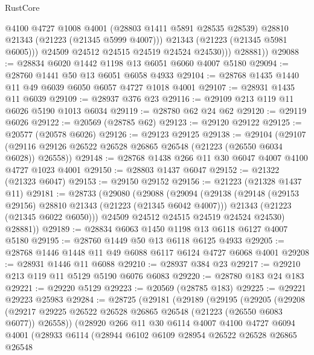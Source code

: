 \begin{lexlean}{RustCore}
\begin{coremodule}
                  @4100
                  @4727
                  @1008
                  @4001
                  (@28803 @1411 @5891 @28535 @28539)
                  @28810
                  @21343
                  (@21223 (@21345 @5999 @4007)))
                @21343
                (@21223 (@21345 @5981 @6005)))
              @24509
              @24512
              @24515
              @24519
              @24524
              @24530)))
        @28881))
@29088 := @28834 @6020 @1442 @1198 @13 @6051 @6060 @4007 @5180
@29094 := @28760 @1441 @50 @13 @6051 @6058 @4933
@29104 := @28768 @1435 @1440 @11 @49 @6039 @6050 @6057 @4727 @1018 @4001
@29107 := @28931 @1435 @11 @6039
@29109 := @28937 @376 @23
@29116 := @29109 @213 @119 @11 @6026 @5190 @1013 @6034
@29119 := @28780 @62 @24 @62
@29120 := @29119 @6026
@29122 := @20569 (@28785 @62)
@29123 := @29120 @29122
@29125 := @20577 (@20578 @6026)
@29126 := @29123 @29125
@29138 := @29104
    (@29107 (@29116 @29126 @26522 @26528 @26865 @26548 (@21223 (@26550 @6034 @6028)) @26558))
@29148 := @28768 @1438 @266 @11 @30 @6047 @4007 @4100 @4727 @1023 @4001
@29150 := @28803 @1437 @6047
@29152 := @21322 (@21323 @6047)
@29153 := @29150 @29152
@29156 := @21223 (@21328 @1437 @11)
@29181 := @28733
    (@29080
      (@29088
        (@29094
          (@29138
            (@29148 (@29153 @29156) @28810 @21343 (@21223 (@21345 @6042 @4007)))
            @21343
            (@21223 (@21345 @6022 @6050)))
          @24509
          @24512
          @24515
          @24519
          @24524
          @24530)
        @28881))
@29189 := @28834 @6063 @1450 @1198 @13 @6118 @6127 @4007 @5180
@29195 := @28760 @1449 @50 @13 @6118 @6125 @4933
@29205 := @28768 @1446 @1448 @11 @49 @6088 @6117 @6124 @4727 @6068 @4001
@29208 := @28931 @1446 @11 @6088
@29210 := @28937 @384 @23
@29217 := @29210 @213 @119 @11 @5129 @5190 @6076 @6083
@29220 := @28780 @183 @24 @183
@29221 := @29220 @5129
@29223 := @20569 (@28785 @183)
@29225 := @29221 @29223 @25983
@29284 := @28725
    (@29181
      (@29189
        (@29195
          (@29205
            (@29208
              (@29217 @29225 @26522 @26528 @26865 @26548 (@21223 (@26550 @6083 @6077)) @26558))
            (@28920
              @266
              @11
              @30
              @6114
              @4007
              @4100
              @4727
              @6094
              @4001
              (@28933
                @6114
                (@28944
                  @6102
                  @6109
                  @28954
                  @26522
                  @26528
                  @26865
                  @26548

\end{coremodule}
\end{lexlean}
